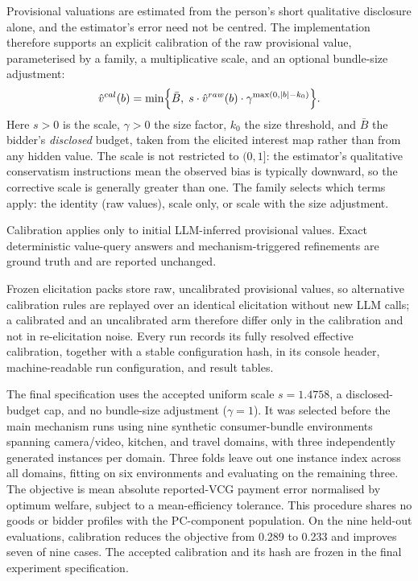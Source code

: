 Provisional valuations are estimated from the person's short qualitative
disclosure alone, and the estimator's error need not be centred. The
implementation therefore supports an explicit calibration of the raw
provisional value, parameterised by a family, a multiplicative scale, and an
optional bundle-size adjustment:
\[
\hat v^{cal}(b)=\min\Bigl\{\bar B,\;
  s\cdot \hat v^{raw}(b)\cdot \gamma^{\max(0,|b|-k_0)}\Bigr\}.
\]
Here \(s>0\) is the scale, \(\gamma>0\) the size factor, \(k_0\) the size
threshold, and \(\bar B\) the bidder's \emph{disclosed} budget, taken from the
elicited interest map rather than from any hidden value. The scale is not
restricted to \((0,1]\): the estimator's qualitative conservatism instructions
mean the observed bias is typically downward, so the corrective scale is
generally greater than one. The family selects which terms apply: the
identity (raw values), scale only, or scale with the size adjustment.

Calibration applies only to initial LLM-inferred provisional values. Exact
deterministic value-query answers and mechanism-triggered refinements are
ground truth and are reported unchanged.

Frozen elicitation packs store raw, uncalibrated provisional values, so
alternative calibration rules are replayed over an identical elicitation
without new LLM calls; a calibrated and an uncalibrated arm therefore differ
only in the calibration and not in re-elicitation noise. Every run records its
fully resolved effective calibration, together with a stable configuration
hash, in its console header, machine-readable run configuration, and result
tables.

The final specification uses the accepted uniform scale \(s=1.4758\), a
disclosed-budget cap, and no bundle-size adjustment (\(\gamma=1\)). It was
selected before the main mechanism runs using nine synthetic consumer-bundle
environments spanning camera/video, kitchen, and travel domains, with three
independently generated instances per domain. Three folds leave out one
instance index across all domains, fitting on six environments and evaluating
on the remaining three. The objective is mean absolute reported-VCG payment
error normalised by optimum welfare, subject to a mean-efficiency tolerance.
This procedure shares no goods or bidder profiles with the PC-component
population. On the nine held-out evaluations, calibration reduces the
objective from 0.289 to 0.233 and improves seven of nine cases. The accepted
calibration and its hash are frozen in the final experiment specification.

